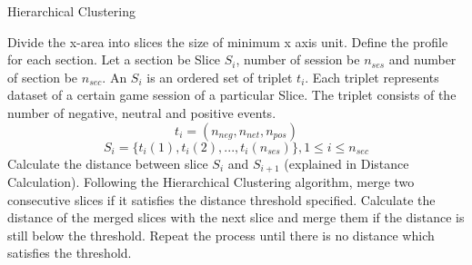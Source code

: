 \begin{algorithm}
  \caption{Hierarchical Clustering}\label{alg:Clustering}
  \begin{algorithmic}[1]
  \STATE Divide the x-area into slices the size of minimum x axis unit.
  \STATE Define the profile for each section. Let a section be Slice $\textit{S}_i$, number of session be $n_{ses}$ and number of section be $n_{sec}$. An $\textit{S}_i$ is an ordered set of triplet $\textit{t}_i$. Each triplet represents dataset of a certain game session of a particular Slice. The triplet consists of the number of negative, neutral and positive events.
$$\textit{t}_i = (n_{neg}, n_{net}, n_{pos})$$
$$\textit{S}_i = \{\textit{t}_i(1), \textit{t}_i(2), ..., \textit{t}_i(n_{ses})\}, 1\le i\le n_{sec}$$
  \STATE Calculate the distance between slice $\textit{S}_i$ and $\textit{S}_{i+1}$ (explained in Distance Calculation).
  \STATE Following the Hierarchical Clustering algorithm\cite{maimon}, merge two consecutive slices if it satisfies the distance threshold specified. Calculate the distance of the merged slices with the next slice and merge them if the distance is still below the threshold. Repeat the process until there is no distance which satisfies the threshold.
  \end{algorithmic}
\end{algorithm}




